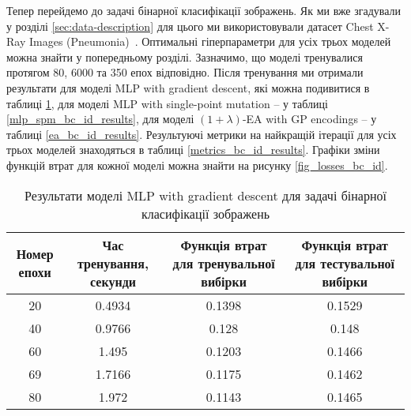 Тепер перейдемо до задачі бінарної класифікації зображень. Як ми вже згадували у розділі \ref{sec:data-description} для цього ми використовували датасет Chest X-Ray Images (Pneumonia)~\cite{ct32}. Оптимальні гіперпараметри для усіх трьох моделей можна знайти у попередньому розділі. Зазначимо, що моделі тренувалися протягом 80, 6000 та 350 епох відповідно. Після тренування ми отримали результати для моделі MLP with gradient descent, які можна подивитися в таблиці \ref{mlp_gd_bc_id_results}, для моделі MLP with single-point mutation -- у таблиці \ref{mlp_spm_bc_id_results}, для моделі $(1+\lambda)$-EA with GP encodings -- у таблиці \ref{ea_bc_id_results}. Результуючі метрики на найкращій ітерації для усіх трьох моделей знаходяться в таблиці \ref{metrics_bc_id_results}. Графіки зміни функцій втрат для кожної моделі можна знайти на рисунку \ref{fig_losses_bc_id}.

\begin{table}[ht]
	\centering
	\begin{adjustbox}{max width=\textwidth}
		\begin{tabular}{|c|c|c|c|}
			\hline 
			Номер епохи & Час тренування, секунди & Функція втрат для тренувальної вибірки & Функція втрат для тестувальної вибірки \\
			\hline 
			20 & 0.4934 & 0.1398 & 0.1529 \\
			\hline 
			40 & 0.9766 & 0.128 & 0.148 \\
			\hline
			60 & 1.495 & 0.1203 & 0.1466 \\
			\hline
			69 & 1.7166 & 0.1175 & 0.1462 \\
			\hline
			80 & 1.972 & 0.1143 & 0.1465 \\
			\hline
		\end{tabular}
	\end{adjustbox}
	\caption{Результати моделі MLP with gradient descent для задачі бінарної класифікації зображень}
	\label{mlp_gd_bc_id_results}
\end{table}

